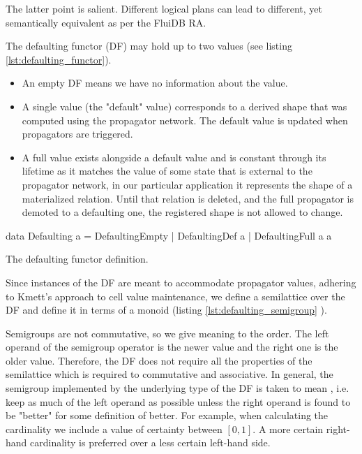 The latter point is salient. Different logical plans can lead to
different, yet semantically equivalent as per the FluiDB RA.

The defaulting functor (DF) may hold up to two values (see listing
\ref{lst:defaulting_functor}).

\begin{itemize}
\item An empty DF means we have no information about the value.
\item A single value (the "default" value) corresponds to a derived
  shape that was computed using the propagator network. The default
  value is updated when propagators are triggered.
\item A full value exists alongside a default value and is constant
  through its lifetime as it matches the value of some state that is
  external to the propagator network, in our particular application it
  represents the shape of a materialized relation. Until that relation
  is deleted, and the full propagator is demoted to a defaulting one,
  the registered shape is not allowed to change.
\end{itemize}

\begin{code}
  \begin{haskellcode}
    data Defaulting a =
      DefaultingEmpty
      | DefaultingDef a
      | DefaultingFull a a
  \end{haskellcode}

  \caption{\label{lst:defaulting_functor}The defaulting functor definition.}
\end{code}

Since instances of the DF are meant to accommodate propagator values,
adhering to Kmett's approach to cell value maintenance, we define a
semilattice over the DF and define it in terms of a monoid (listing
\ref{lst:defaulting_semigroup} ).

Semigroups are not commutative, so we give meaning to the order. The
left operand of the semigroup operator is the newer value and the
right one is the older value. Therefore, the DF does not require all
the properties of the semilattice which is required to commutative and
associative. In general, the semigroup implemented by the underlying
type of the DF is taken to mean , i.e. keep as
much of the left operand as possible unless the right operand is found
to be "better" for some definition of better. For example, when
calculating the cardinality we include a value of certainty between
\(\left[0,1\right]\).  A more certain right-hand cardinality is
preferred over a less certain left-hand side.

